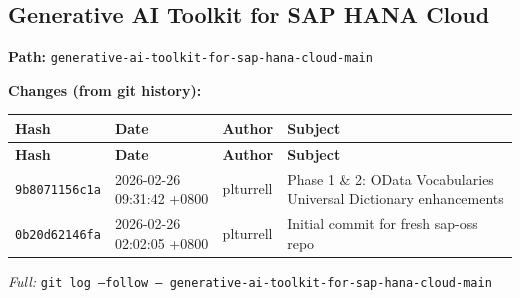 \documentclass[11pt]{article}
\begin{document}
\subsection{Generative AI Toolkit for SAP HANA Cloud}
\textbf{Path:} \texttt{generative-ai-toolkit-for-sap-hana-cloud-main}

\textbf{Changes (from git history):}
\begin{longtable}{|p{2.2cm}|p{3.2cm}|l|p{6cm}|}
\hline \textbf{Hash} & \textbf{Date} & \textbf{Author} & \textbf{Subject} \\ \hline \endfirsthead
\hline \textbf{Hash} & \textbf{Date} & \textbf{Author} & \textbf{Subject} \\ \hline \endhead
\texttt{9b8071156c1a} & 2026-02-26 09:31:42 +0800 & plturrell & Phase 1 \& 2: OData Vocabularies Universal Dictionary enhancements \\
\texttt{0b20d62146fa} & 2026-02-26 02:02:05 +0800 & plturrell & Initial commit for fresh sap-oss repo \\
\hline
\end{longtable}
\textit{Full:} \texttt{git log --follow -- generative-ai-toolkit-for-sap-hana-cloud-main}
\end{document}

